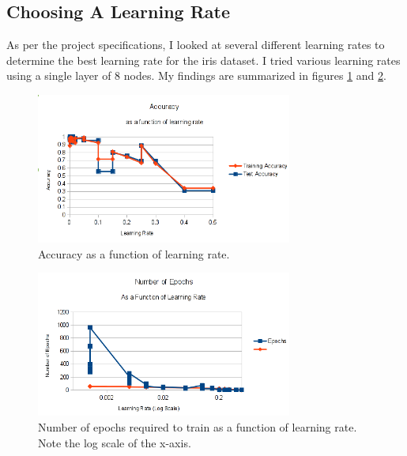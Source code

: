 \documentclass[12pt]{article}
\begin{document}
\subsection{Choosing A Learning Rate}

As per the project specifications, I looked at several different learning rates
to determine the best learning rate for the iris dataset. I tried various
learning rates using a single layer of 8 nodes. My findings are summarized in
    figures \ref{fig:learning_rate_accuracy} and
\ref{fig:learning_rate_epochs}.
\begin{figure}[!ht]
    \begin{center}
        \includegraphics[width=0.75\textwidth]{Iris-LearningRate-Accuracy}
    \end{center}
    \caption{Accuracy as a function of learning rate.}
  \label{fig:learning_rate_accuracy}
\end{figure}

\begin{figure}[!ht]
    \begin{center}
        \includegraphics[width=0.75\textwidth]{Iris-LearningRate-Epochs}
    \end{center}
    \caption{Number of epochs required to train as a function of learning rate.
    Note the log scale of the x-axis.}
  \label{fig:learning_rate_epochs}
\end{figure}
\end{document}
